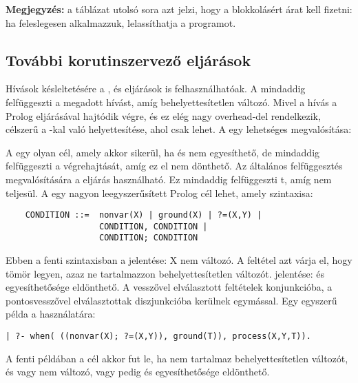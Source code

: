 {\bf Megjegyzés:} a táblázat utolsó sora azt jelzi, hogy a
blokkolásért árat kell fizetni: ha feleslegesen alkalmazzuk,
lelassíthatja a programot.

\subsection{További korutinszervező eljárások}

Hívások késleltetésére a ,  és  eljárások
is felhasználhatóak. A  mindaddig felfüggeszti a
megadott hívást, amíg  behelyettesítetlen változó. Mivel a hívás a
Prolog  eljárásával hajtódik végre, és ez elég nagy overhead-del
rendelkezik, célszerű a  -kal való helyettesítése, ahol
csak lehet. A  egy lehetséges megvalósítása:


A 
egy olyan cél, amely akkor sikerül, ha  és  nem egyesíthető, de
mindaddig felfüggeszti a végrehajtását, amíg ez el nem dönthető. Az általános
felfüggesztés megvalósítására a  eljárás használható.
Ez mindaddig felfüggeszti t, amíg  nem teljesül. A
 egy nagyon leegyszerűsített Prolog cél lehet, amely szintaxisa:

\begin{verbatim}
    CONDITION ::=  nonvar(X) | ground(X) | ?=(X,Y) |
                   CONDITION, CONDITION |
                   CONDITION; CONDITION
\end{verbatim}

Ebben a fenti szintaxisban a  jelentése: X nem változó. A
 feltétel azt várja el, hogy  tömör legyen, azaz ne
tartalmazzon behelyettesítetlen változót.  jelentése:
 és  egyesíthetősége eldönthető. A vesszővel elválasztott
feltételek konjunkcióba, a pontosvesszővel elválasztottak diszjunkcióba
kerülnek egymással. Egy egyszerű példa a  használatára:

\begin{verbatim}
| ?- when( ((nonvar(X); ?=(X,Y)), ground(T)), process(X,Y,T)).
\end{verbatim}

A fenti példában a  cél akkor fut le, ha  nem
tartalmaz behelyettesítetlen változót, és vagy  nem változó, vagy
pedig  és  egyesíthetősége eldönthető.

